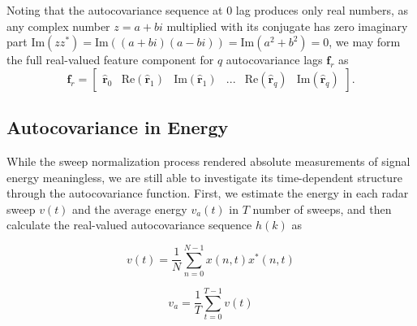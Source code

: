 Noting that the autocovariance sequence at 0 lag produces only real numbers, as any complex number $z = a + bi$ multiplied with its conjugate has zero imaginary part $\text{Im}(zz^*) = \text{Im}((a + bi)(a - bi)) = \text{Im}(a^2 + b^2) = 0$, we may form the full real-valued feature component for $q$ autocovariance lags $\mathbf{f}_{r}$ as
\begin{equation}
	\mathbf{f}_{r} = 
	\begin{bmatrix}
		\hat{\mathbf{r}}_{0}  & \text{Re}(\hat{\mathbf{r}}_{1} ) & \text{Im}(\hat{\mathbf{r}}_{1} ) & ... & \text{Re}(\hat{\mathbf{r}}_{q} ) & \text{Im}(\hat{\mathbf{r}}_{q} )
	\end{bmatrix}.
\end{equation}





\subsection{Autocovariance in Energy}

While the sweep normalization process rendered absolute measurements of signal energy meaningless, we are still able to investigate its time-dependent structure through the autocovariance function. First, we estimate the energy in each radar sweep $v(t)$ and the average energy $v_a(t)$ in $T$ number of sweeps, and then calculate the real-valued autocovariance sequence $h(k)$ as 

\begin{equation}
	v(t) = \frac{1}{N}\sum_{n=0}^{N-1}x(n,t)x^*(n,t)
\end{equation}

\begin{equation} 
	v_a = \frac{1}{T}\sum_{t=0}^{T-1}v(t)
\end{equation}

